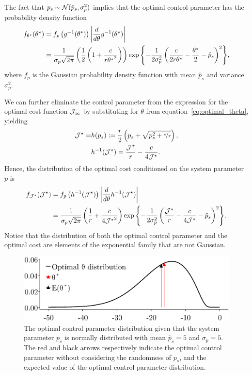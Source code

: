 %
The fact that $p_s \sim \mathcal{N}(\hat{p}_s, \sigma_p^2)$ implies that the optimal
control parameter has the probability density function
%
\begin{align*} 
    f_{\theta^\star}(\theta^\star) &= f_p\left(g^{-1}(\theta^\star)\right)
        \left|{\frac{d}{d\theta}g^{-1}(\theta^\star)}\right| \\ 
        &= \frac{1}{\sigma_p
        \sqrt{2\pi}}\left(\frac{1}{2}\left(1+\frac{c}{r{\theta^\star}^2}\right)\right)
        \exp{\left\{-\frac{1}{2\sigma_p^2}\left(
        \frac{c}{2r\theta^\star} - \frac{\theta^\star}{2} - \hat{p}_s
        \right)^2\right\}}, 
\end{align*}
%
where $f_p$ is the Gaussian probability density function with mean $\hat{p}_s$ and
variance $\sigma_p^2$. 

We can further eliminate the control parameter from the
expression for the optimal cost function $\mathcal{J}_\infty$ by
substituting for $\theta$ from
equation~\eqref{eq:optimal_theta}, yielding 
%
\begin{align*}
\mathcal{J}^\star = &h(p_s) := \frac{r}{2}\left( p_s +
\sqrt{p_s^2 + \nicefrac{c}{r}} \right), \\
&h^{-1}(\mathcal{J}^\star) = \frac{\mathcal{J}^\star}{r} -
\frac{c}{4\mathcal{J}^\star}.
\end{align*}
%
Hence, the distribution of the optimal cost conditioned on the system parameter
$p$ is 
%
\begin{align*} 
    f_{\mathcal{J}^\star}(\mathcal{J}^\star) &=f_p\left(h^{-1}(\mathcal{J}^\star)\right)
        \left|{\frac{d}{d\theta}h^{-1}(\mathcal{J}^\star)}\right| \\
        &= \frac{1}{\sigma_p
        \sqrt{2\pi}}\left(\frac{1}{r} + \frac{c}{4{\mathcal{J}^\star}^2}\right)
        \exp{\left\{ -\frac{1}{2\sigma_p^2} \left(
        \frac{\mathcal{J}^\star}{r} - \frac{c}{4\mathcal{J}^\star} -
        \hat{p}_s\right)^2\right\}}.
\end{align*}
%
Notice that the distribution of both the optimal control parameter and the
optimal cost are elements of the exponential family that are not Gaussian. 

\begin{figure}[tb]
  \centering
  \includegraphics[width=0.7\linewidth]{./figures/optimal-dist.eps}
  \caption{The optimal control parameter distribution given that the system
  parameter $p_s$ is normally distributed with mean $\hat{p}_s = 5$ and $\sigma_p
  = 5$. The red and black arrows respectively indicate the optimal control
  parameter without considering the randomness of $p_s$, and the expected value
  of the optimal control parameter distribution.}
  \label{fig:optimal_dist}
\end{figure}


